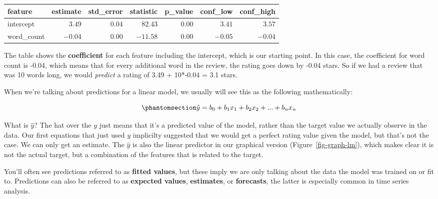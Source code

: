 \documentclass[
  letterpaper,
]{krantz}
\begin{document}
\begin{longtable*}{lrrrrrr}
\toprule
feature & estimate & std\_error & statistic & p\_value & conf\_low & conf\_high \\ 
\midrule\addlinespace[2.5pt]
intercept & \textcolor[HTML]{404040}{$3.49$} & \textcolor[HTML]{404040}{$0.04$} & \textcolor[HTML]{404040}{$82.43$} & \textcolor[HTML]{404040}{$0.00$} & \textcolor[HTML]{404040}{$3.41$} & \textcolor[HTML]{404040}{$3.57$} \\ 
word\_count & \textcolor[HTML]{404040}{$-0.04$} & \textcolor[HTML]{404040}{$0.00$} & \textcolor[HTML]{404040}{$-11.58$} & \textcolor[HTML]{404040}{$0.00$} & \textcolor[HTML]{404040}{$-0.05$} & \textcolor[HTML]{404040}{$-0.04$} \\ 
\bottomrule
\end{longtable*}

\normalsize

The table shows the \textbf{coefficient} for each feature including the
intercept, which is our starting point. In this case, the coefficient
for word count is -0.04, which means that for every additional word in
the review, the rating goes down by -0.04 stars. So if we had a review
that was 10 words long, we would \emph{predict} a rating of 3.49 +
10*-0.04 = 3.1 stars.

When we're talking about predictions for a linear model, we usually will
see this as the following mathematically:

\begin{equation}\phantomsection\label{eq-lm-prediction}{
\hat{y} = b_0 + b_1x_1 + b_2x_2 + ... + b_nx_n
}\end{equation}

What is \(\hat{y}\)? The hat over the \(y\) just means that it's a
predicted value of the model, rather than the target value we actually
observe in the data. Our first equations that just used \(y\) implicilty
suggested that we would get a perfect rating value given the model, but
that's not the case. We can only get an estimate. The \(\hat{y}\) is
also the linear predictor in our graphical version
(Figure~\ref{fig-graph-lm}), which makes clear it is not the actual
target, but a combination of the features that is related to the target.

\begin{tcolorbox}[enhanced jigsaw, colframe=quarto-callout-tip-color-frame, opacityback=0, breakable, left=2mm, rightrule=.15mm, toprule=.15mm, arc=.35mm, leftrule=.75mm, colback=white, bottomrule=.15mm]

You'll often see predictions referred to as \textbf{fitted values}, but
these imply we are only talking about the data the model was trained on
or fit to. Predictions can also be referred to as \textbf{expected
values}, \textbf{estimates}, or \textbf{forecasts}, the latter is
especially common in time series analysis.

\end{tcolorbox}
\end{document}
